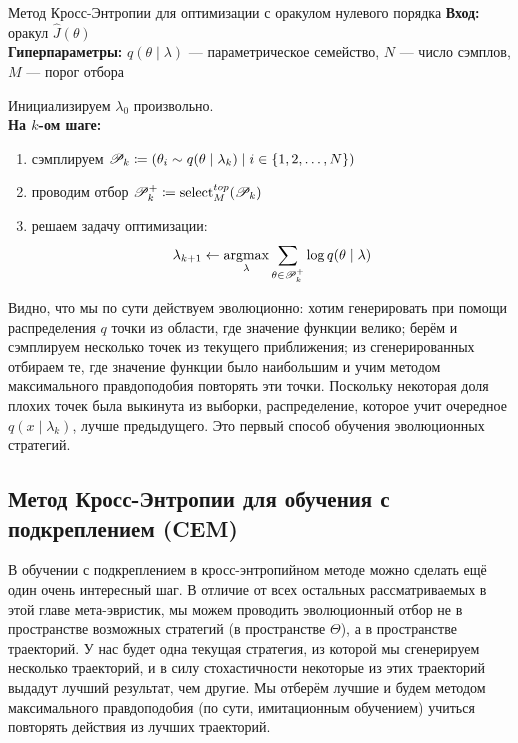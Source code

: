 \begin{algorithm}{Метод Кросс-Энтропии для оптимизации с оракулом нулевого порядка}
\textbf{Вход:} оракул $\hat{J}(\theta)$ \\
\textbf{Гиперпараметры:} $q(\theta \mid \lambda)$ --- параметрическое семейство, $N$ --- число сэмплов, $M$ --- порог отбора

\vspace{0.3cm}
Инициализируем $\lambda_0$ произвольно. \\
\textbf{На $k$-ом шаге:}
\begin{enumerate}
    \item сэмплируем $\mathscr{P}_k \coloneqq \left( \theta_i \sim q(\theta \mid \lambda_k) \mid i \in \{1, 2, \dots, N\} \right)$
    \item проводим отбор $\mathscr{P}^{+}_k \coloneqq \mathrm{select}^{\mathop{top}}_M(\mathscr{P}_k)$
    \item решаем задачу оптимизации:
    $$\lambda_{k+1} \leftarrow \mathop{\mathrm{argmax}}_{\lambda} \sum_{\theta \in \mathscr{P}^{+}_k} \log q(\theta \mid \lambda)$$
\end{enumerate}
\end{algorithm}

Видно, что мы по сути действуем эволюционно: хотим генерировать при помощи распределения $q$ точки из области, где значение функции велико; берём и сэмплируем несколько точек из текущего приближения; из сгенерированных отбираем те, где значение функции было наибольшим и учим методом максимального правдоподобия повторять эти точки. Поскольку некоторая доля плохих точек была выкинута из выборки, распределение, которое учит очередное $q(x \mid \lambda_k)$, лучше предыдущего. Это первый способ обучения эволюционных стратегий.

\subsection{Метод Кросс-Энтропии для обучения с подкреплением (CEM)}

В обучении с подкреплением в кросс-энтропийном методе можно сделать ещё один очень интересный шаг. В отличие от всех остальных рассматриваемых в этой главе мета-эвристик, мы можем проводить эволюционный отбор не в пространстве возможных стратегий (в пространстве $\Theta$), а в пространстве траекторий. У нас будет одна текущая стратегия, из которой мы сгенерируем несколько траекторий, и в силу стохастичности некоторые из этих траекторий выдадут лучший результат, чем другие. Мы отберём лучшие и будем методом максимального правдоподобия (по сути, имитационным обучением) учиться повторять действия из лучших траекторий.  

